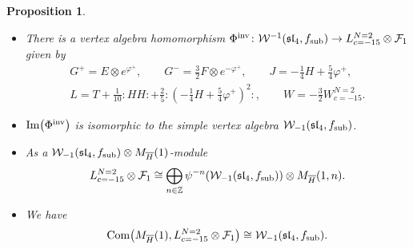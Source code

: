 \documentclass[11pt]{article}
\numberwithin{equation}{section}
\newcommand{\Z}{\mathbb Z}
\newcommand{\F}{\mathcal F}
\newtheorem{Proposition}[Theorem]{Proposition}
\begin{document}
\begin{Proposition} \label{ulaganje-2}
\quad
\begin{itemize}\itemsep=0pt
	\item[$(1)$] There is a vertex algebra homomorphism $\Phi^{\rm inv} \colon \mathcal{W}^{-1}(\mathfrak{sl}_4, f_{\rm sub}) \rightarrow L^{N=2}_{c=-15} \otimes \F_{1}$ given by
	\begin{gather*}
		G^+ = E\otimes e^{\varphi^+}, \qquad
		G^- = \frac{3}{2} F \otimes e^{-\varphi^+}, \qquad
		J = - \frac{1}{4} H + \frac{5}{4} \varphi^+, \\
		L = T + \frac{1} {10} {:}H H{:}+ \frac{2}{5} {:}\left( - \frac{1}{4} H + \frac{5}{4} \varphi^+\right)^2{:}, \qquad
		W = -\frac{3}{2} W^{N=2}_{c=-15}.
	\end{gather*}
	
\item[$(2)$] $\operatorname{Im} \bigl(\Phi^{\rm inv}\bigr) $ is isomorphic to the simple vertex algebra $ \mathcal{W}_{-1}(\mathfrak{sl}_4, f_{\rm sub})$.

\item[$(3)$]
 As a $ \mathcal{W}_{-1}(\mathfrak{sl}_4, f_{\rm sub})\otimes M_{\overline{H}} (1)$-module
\[
L^{N=2}_{c=-15} \otimes \F_{1} \cong \bigoplus_{n\in {\Z} }
 \psi^{-n} ( \mathcal{W}_{-1}(\mathfrak{sl}_4, f_{\rm sub})) \otimes M_{\overline{H}} (1, n).
 \]
 \item[$(4)$] We have
\[
 \operatorname{Com} \bigl(M_{\overline{H}}(1), L^{N=2}_{c=-15} \otimes \F_{1}\bigr) \cong \mathcal{W}_{-1}(\mathfrak{sl}_4, f_{\rm sub}).
 \]
 \end{itemize}
	
\end{Proposition}
\end{document}
